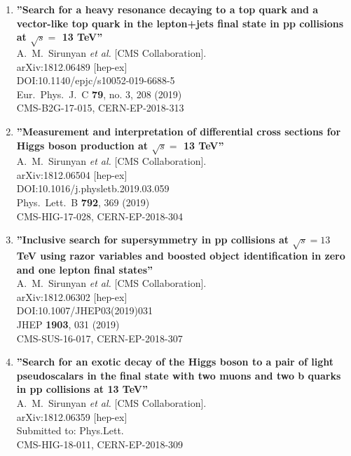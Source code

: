 \begin{enumerate}
\item%
{\bf ''Search for a heavy resonance decaying to a top quark and a vector-like top quark in the lepton+jets final state in pp collisions at $\sqrt{s} =$ 13 TeV''}
  \\{}A.~M.~Sirunyan {\it et al.} [CMS Collaboration].
  \\{}arXiv:1812.06489 [hep-ex]
  \\{}DOI:10.1140/epjc/s10052-019-6688-5
  \\{}Eur.\ Phys.\ J.\ C {\bf 79}, no. 3, 208 (2019)
  \\{}CMS-B2G-17-015, CERN-EP-2018-313

\item%
{\bf ''Measurement and interpretation of differential cross sections for Higgs boson production at $\sqrt{s} =$ 13 TeV''}
  \\{}A.~M.~Sirunyan {\it et al.} [CMS Collaboration].
  \\{}arXiv:1812.06504 [hep-ex]
  \\{}DOI:10.1016/j.physletb.2019.03.059
  \\{}Phys.\ Lett.\ B {\bf 792}, 369 (2019)
  \\{}CMS-HIG-17-028, CERN-EP-2018-304

\item%
{\bf ''Inclusive search for supersymmetry in pp collisions at $ \sqrt{s}=13 $ TeV using razor variables and boosted object identification in zero and one lepton final states''}
  \\{}A.~M.~Sirunyan {\it et al.} [CMS Collaboration].
  \\{}arXiv:1812.06302 [hep-ex]
  \\{}DOI:10.1007/JHEP03(2019)031
  \\{}JHEP {\bf 1903}, 031 (2019)
  \\{}CMS-SUS-16-017, CERN-EP-2018-307

\item%
{\bf ''Search for an exotic decay of the Higgs boson to a pair of light pseudoscalars in the final state with two muons and two b quarks in pp collisions at 13 TeV''}
  \\{}A.~M.~Sirunyan {\it et al.} [CMS Collaboration].
  \\{}arXiv:1812.06359 [hep-ex]
  \\{}Submitted to: Phys.Lett.
  \\{}CMS-HIG-18-011, CERN-EP-2018-309


\end{enumerate}
